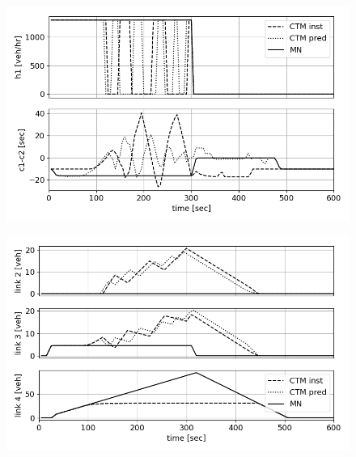 \begin{figure}[h]
    \centering
    \includegraphics[width=\linewidth]{figs/ctm_vs_mn_hc.png}
    \caption{\XXX }
    \label{fig:ctm_vs_mn_hc}
\end{figure}

\begin{figure}[h]
    \centering
    \includegraphics[width=\linewidth]{figs/ctm_vs_mn_x.png}
    \caption{\XXX }
    \label{fig:ctm_vs_mn_x}
\end{figure}

